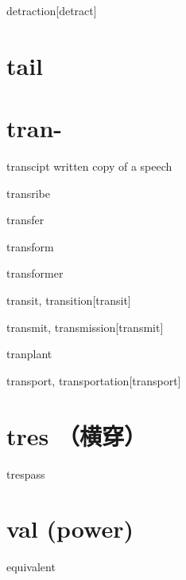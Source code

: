 \begin{RefWord}{detraction}[detract]
\end{RefWord}

\section{tail}



\section{tran-}

\begin{RefWord}{transcipt}
    written copy of a speech
\end{RefWord}

\begin{RefWord}{transribe}
\end{RefWord}

\begin{RefWord}{transfer}
\end{RefWord}

\begin{RefWord}{transform}
\end{RefWord}

\begin{RefWord}{transformer}
\end{RefWord}

\begin{RefWord}{transit, transition}[transit]
\end{RefWord}

\begin{RefWord}{transmit, transmission}[transmit]
\end{RefWord}

\begin{RefWord}{tranplant}
\end{RefWord}

\begin{RefWord}{transport, transportation}[transport]
\end{RefWord}

\section{tres （横穿）}

\begin{RefWord}{trespass}
\end{RefWord}

\section{val (power)}

\begin{RefWord}{equivalent}
\end{RefWord}